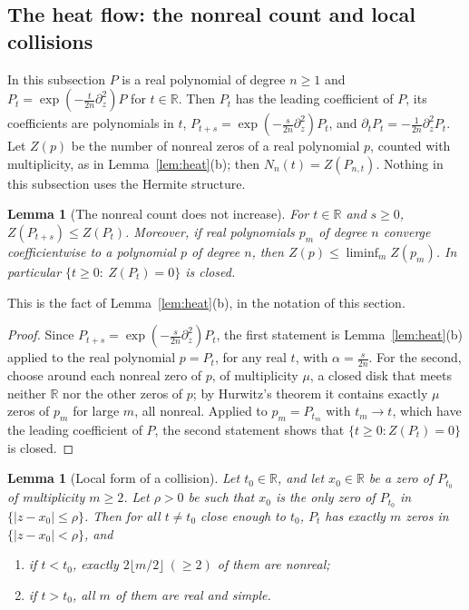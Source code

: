 \documentclass[11pt]{amsart}
\newtheorem{lemma}[theorem]{Lemma}
\theoremstyle{definition}
\theoremstyle{remark}
\numberwithin{equation}{section}
\newcommand{\R}{\mathbb{R}}
\begin{document}
\subsection{The heat flow: the nonreal count and local collisions}\label{subsec:collision-heat}
In this subsection $P$ is a real polynomial of degree $n\ge1$ and $P_t=\exp(-\frac t{2n}\partial_z^2)P$ for $t\in\R$. Then $P_t$ has the leading coefficient of $P$, its coefficients are polynomials in $t$, $P_{t+s}=\exp(-\frac s{2n}\partial_z^2)P_t$, and $\partial_tP_t=-\frac1{2n}\partial_z^2P_t$. Let $Z(p)$ be the number of nonreal zeros of a real polynomial $p$, counted with multiplicity, as in Lemma~\ref{lem:heat}(b); then $N_n(t)=Z(P_{n,t})$. Nothing in this subsection uses the Hermite structure.

\begin{lemma}[The nonreal count does not increase]\label{lem:heatcount}
For $t\in\R$ and $s\ge0$, $Z(P_{t+s})\le Z(P_t)$. Moreover, if real polynomials $p_m$ of degree $n$ converge coefficientwise to a polynomial $p$ of degree $n$, then $Z(p)\le\liminf_mZ(p_m)$. In particular $\{t\ge0:\ Z(P_t)=0\}$ is closed.
\end{lemma}

This is the fact of Lemma~\ref{lem:heat}(b), in the notation of this section.

\begin{proof}
Since $P_{t+s}=\exp(-\frac s{2n}\partial_z^2)P_t$, the first statement is Lemma~\ref{lem:heat}(b) applied to the real polynomial $p=P_t$, for any real $t$, with $\alpha=\frac s{2n}$. For the second, choose around each nonreal zero of $p$, of multiplicity $\mu$, a closed disk that meets neither $\R$ nor the other zeros of $p$; by Hurwitz's theorem it contains exactly $\mu$ zeros of $p_m$ for large $m$, all nonreal. Applied to $p_m=P_{t_m}$ with $t_m\to t$, which have the leading coefficient of $P$, the second statement shows that $\{t\ge0:Z(P_t)=0\}$ is closed.
\end{proof}

\begin{lemma}[Local form of a collision]\label{lem:localform}
Let $t_0\in\R$, and let $x_0\in\R$ be a zero of $P_{t_0}$ of multiplicity $m\ge2$. Let $\rho>0$ be such that $x_0$ is the only zero of $P_{t_0}$ in $\{|z-x_0|\le\rho\}$. Then for all $t\ne t_0$ close enough to $t_0$, $P_t$ has exactly $m$ zeros in $\{|z-x_0|<\rho\}$, and
\begin{enumerate}
\item[(a)] if $t<t_0$, exactly $2\lfloor m/2\rfloor\ (\ge2)$ of them are nonreal;
\item[(b)] if $t>t_0$, all $m$ of them are real and simple.
\end{enumerate}
\end{lemma}
\end{document}
